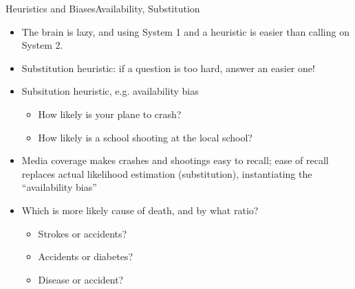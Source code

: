 \documentclass{beamer}
\begin{document}
\begin{frame}{Heuristics and Biases}{Availability, Substitution}
\begin{itemize}
\addtolength{\itemsep}{0.5\baselineskip}
\item The brain is lazy, and using System 1 and a heuristic is easier than calling on System 2.
\item Substitution heuristic: if a question is too hard, answer an easier one!
\item Subsitution heuristic, e.g. availability bias
  \begin{itemize}
  \addtolength{\itemsep}{0.5\baselineskip}
  \item How likely is your plane to crash?
  \item How likely is a school shooting at the local school?
  \end{itemize}
\item Media coverage makes crashes and shootings easy to recall; ease of recall replaces actual likelihood estimation (substitution), instantiating the ``availability bias'' 
\item Which is more likely cause of death, and by what ratio? 
  \begin{itemize}
  \addtolength{\itemsep}{0.5\baselineskip}
  \item Strokes or accidents?
  \item Accidents or diabetes?
  \item Disease or accident?
  \end{itemize}
\end{itemize}
\end{frame}
\end{document}

